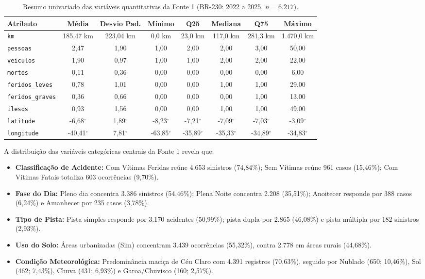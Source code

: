 \documentclass[11pt,a4paper]{article}
\begin{document}
\begin{table}[H]
\centering
\small
\renewcommand{\arraystretch}{1.2}
\caption{Resumo univariado das variáveis quantitativas da Fonte 1 (BR-230: 2022 a 2025, $n=6.217$).}
\label{tab:resumo_numerico_f1}
\begin{tabularx}{\textwidth}{|p{2.8cm}|c|c|c|c|c|c|c|}
\hline
\textbf{Atributo} & \textbf{Média} & \textbf{Desvio Pad.} & \textbf{Mínimo} & \textbf{Q25} & \textbf{Mediana} & \textbf{Q75} & \textbf{Máximo} \\
\hline
\texttt{km} & 185,47 km & 223,04 km & 0,0 km & 23,0 km & 117,0 km & 281,3 km & 1.470,0 km \\
\hline
\texttt{pessoas} & 2,47 & 1,90 & 1,00 & 2,00 & 2,00 & 3,00 & 50,00 \\
\hline
\texttt{veiculos} & 1,90 & 0,97 & 1,00 & 1,00 & 2,00 & 2,00 & 22,00 \\
\hline
\texttt{mortos} & 0,11 & 0,36 & 0,00 & 0,00 & 0,00 & 0,00 & 6,00 \\
\hline
\texttt{feridos\_leves} & 0,78 & 1,01 & 0,00 & 0,00 & 1,00 & 1,00 & 29,00 \\
\hline
\texttt{feridos\_graves} & 0,36 & 0,66 & 0,00 & 0,00 & 0,00 & 1,00 & 13,00 \\
\hline
\texttt{ilesos} & 0,93 & 1,56 & 0,00 & 0,00 & 1,00 & 1,00 & 49,00 \\
\hline
\texttt{latitude} & -6,68$^\circ$ & 1,89$^\circ$ & -8,23$^\circ$ & -7,21$^\circ$ & -7,09$^\circ$ & -7,03$^\circ$ & -3,09$^\circ$ \\
\hline
\texttt{longitude} & -40,41$^\circ$ & 7,81$^\circ$ & -63,85$^\circ$ & -35,89$^\circ$ & -35,33$^\circ$ & -34,89$^\circ$ & -34,83$^\circ$ \\
\hline
\end{tabularx}
\end{table}

A distribuição das variáveis categóricas centrais da Fonte 1 revela que:
\begin{itemize}
    \item \textbf{Classificação de Acidente:} Com Vítimas Feridas reúne 4.653 sinistros (74,84\%); Sem Vítimas reúne 961 casos (15,46\%); Com Vítimas Fatais totaliza 603 ocorrências (9,70\%).
    \item \textbf{Fase do Dia:} Pleno dia concentra 3.386 sinistros (54,46\%); Plena Noite concentra 2.208 (35,51\%); Anoitecer responde por 388 casos (6,24\%) e Amanhecer por 235 casos (3,78\%).
    \item \textbf{Tipo de Pista:} Pista simples responde por 3.170 acidentes (50,99\%); pista dupla por 2.865 (46,08\%) e pista múltipla por 182 sinistros (2,93\%).
    \item \textbf{Uso do Solo:} Áreas urbanizadas (Sim) concentram 3.439 ocorrências (55,32\%), contra 2.778 em áreas rurais (44,68\%).
    \item \textbf{Condição Meteorológica:} Predominância maciça de Céu Claro com 4.391 registros (70,63\%), seguido por Nublado (650; 10,46\%), Sol (462; 7,43\%), Chuva (431; 6,93\%) e Garoa/Chuvisco (160; 2,57\%).
\end{itemize}
\end{document}
